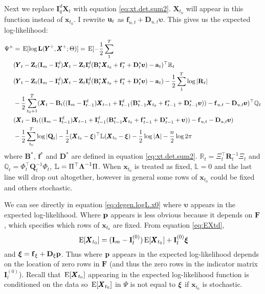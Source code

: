 \documentclass[]{article}
\def\uupsilon{\pmb{\upsilon}}
\def\xixi{\mbox{\boldmath $\xi$}}
\def\LAM{\mbox{\boldmath $\Lambda$}}
\def\LAMm{\mathbb{L}}
\def\UPS{\mbox{\boldmath $\Upsilon$}}
\def\XI{\mbox{\boldmath $\Xi$}}
\def\BB{\mbox{$\mathbf B$}}	\def\bb{\mbox{$\mathbf b$}} \def\Bb{\mbox{$\mathbf J$}} \def\Ba{\mbox{$\mathbf L$}} \def\Bm{\UPS}
\def\DD{\mbox{$\mathbf D$}}	\def\dd{\mbox{$\mathbf d$}}
\def\E{\,\textup{\textrm{E}}}
\def\FF{\mbox{$\mathbf F$}} \def\ff{\mbox{$\mathbf f$}}
\def\II{\mbox{$\mathbf I$}} \def\ii{\mbox{$\mathbf i$}}
\def\LL{\mbox{$\mathbf L$}}	\def\ll{\mbox{$\mathbf l$}}
\def\QQ{\mbox{$\mathbf Q$}}	 \def\qq{\mbox{$\mathbf q$}} \def\Qb{\mbox{$\mathbf G$}}  \def\Qm{\mathbb{Q}}
\def\RR{\mbox{$\mathbf R$}}	 \def\rr{\mbox{$\mathbf r$}} \def\Rb{\mbox{$\mathbf H$}}	\def\Rm{\mathbb{R}}
\def\XX{\mbox{$\pmb{X}$}}	\def\xx{\mbox{$\pmb{x}$}}
\def\YY{\mbox{$\pmb{Y}$}}	\def\yy{\mbox{$\pmb{y}$}}
\def\ZZ{\mbox{$\mathbf Z$}}	\def\zz{\mbox{$\mathbf z$}}	\def\Zb{\mbox{$\mathbf M$}} \def\Za{\mbox{$\mathbf N$}} \def\Zm{\XI}
\begin{document}
Next we replace $\II_q^d\XX_t$ with equation \ref{eq:xt.det.sum2}.  $\XX_{t_0}$ will appear in this function instead of $\xx_{t_0}$.  I rewrite $\mbox{$\mathbf u$}_t$ as $\ff_{u,t}+\DD_{u,t}\uupsilon$.  This gives us the expected log-likelihood:
\begin{equation}\label{eq:degen.logL.x0}
\begin{split}
\Psi^+ &= \E[\log\LL(\YY^+,\XX^+ ; \Theta)] = \E[-\frac{1}{2}\sum_1^T \\
& (\YY_t - \ZZ_t(\II_m-\II_t^d)\XX_t - \ZZ_t\II_t^d(\BB^*_t\XX_{t_0} + \ff^*_t +\DD^*_t\uupsilon) - \aa_t)^\top \Rm_t\\ 
&(\YY_t - \ZZ_t(\II_m-\II_t^d)\XX_t - \ZZ_t\II_t^d(\BB^*_t\XX_{t_0} + \ff^*_t +\DD^*_t\uupsilon) - \aa_t) -\frac{1}{2}\sum_1^T\log |\RR_t|\\
& -\frac{1}{2}\sum_{t_0+1}^T (\XX_t - \BB_t ((\II_m - \II_{t-1}^d)\XX_{t-1} + \II_{t-1}^d(\BB^*_{t-1}\XX_{t_0} + \ff^*_{t-1} +\DD^*_{t-1}\uupsilon)) - \ff_{u,t} - \DD_{u,t}\uupsilon)^\top \Qm_t \\
&(\XX_t - \BB_t ((\II_m - \II_{t-1}^d)\XX_{t-1} + \II_{t-1}^d(\BB^*_{t-1}\XX_{t_0} + \ff^*_{t-1} +\DD^*_{t-1}+\uupsilon)) - \ff_{u,t} - \DD_{u,t}\uupsilon) \\
&- \frac{1}{2}\sum_{t_0}^T\log |\QQ_t|   - \frac{1}{2}(\XX_{t_0} - \xixi)^\top \LAMm(\XX_{t_0} - \xixi) - \frac{1}{2}\log |\LAM| -\frac{n}{2}\log 2\pi 
\end{split}
\end{equation}
where $\BB^*$, $\ff^*$ and $\DD^*$ are defined in equation \ref{eq:xt.det.sum2}.  $\Rm_t = \Xi_t^\top\RR_t^{-1}\Xi_t$ and $\Qm_t = \Phi_t^\top\QQ_t^{-1}\Phi_t$, $\LAMm = \Pi^\top\LAM^{-1}\Pi$.  When $\xx_{t_0}$ is treated as fixed, $\LAMm=0$ and the last line will drop out altogether, however in general some rows of $\xx_{t_0}$ could be fixed and others stochastic.  

We can see directly in equation \ref{eq:degen.logL.x0} where $\uupsilon$ appears in the expected log-likelihood.  Where $\mbox{$\mathbf p$}$ appears is less obvious because it depends on $\FF$, which specifies which rows of $\xx_{t_0}$ are fixed.  From equation \ref{eq:EXtd}, $$\E[\XX_{t_0}]=(\II_m-\II_l^{(0)})\E[\XX_{t_0}]+\II_l^{(0)}\xixi$$
and $\xixi=\ff_\xi+\DD_\xi\pp$.  Thus where $\mbox{$\mathbf p$}$ appears in the expected log-likelihood depends on the location of zero rows in $\FF$ (and thus the zero rows in the indicator matrix $\II_l^{(0)}$).  Recall that $\E[\XX_{t_0}]$ appearing in the expected log-likelihood function is conditioned on the data so $\E[\XX_{t_0}]$ in $\Psi$ is not equal to $\xixi$ if $\xx_{t_0}$ is stochastic. 
\end{document}
